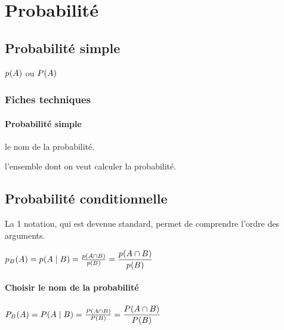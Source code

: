 \documentclass[12pt,a4paper]{article}
\begin{document}
\section{Probabilité}

\subsection{Probabilité \og simple \fg}

\newparaexample*{}

\begin{latexex}
$\proba{A}$
ou
$\proba[P]{A}$
\end{latexex}




\subsubsection{Fiches techniques}

\paragraph{Probabilité \og simple \fg}


\IDoption{} le nom de la probabilité.

\IDarg{} l'ensemble dont on veut calculer la probabilité.




\subsection{Probabilité conditionnelle}

\newparaexample*{}

La 1\iere{} notation, qui est devenue standard, permet de comprendre l'ordre des arguments.
\begin{latexex}
$\probacond{B}{A}
 =
 \probacond*{B}{A}
 =
 \probacond**{B}{A}
 =
 \dprobacond**{B}{A}$
\end{latexex}




\paragraph{Choisir le nom de la probabilité}

\begin{latexex}
$\probacond[P]{B}{A}
 =
 \probacond*[P]{B}{A}
 =
 \probacond**[P]{B}{A}
 =
 \dprobacond**[P]{B}{A}$
\end{latexex}
\end{document}
